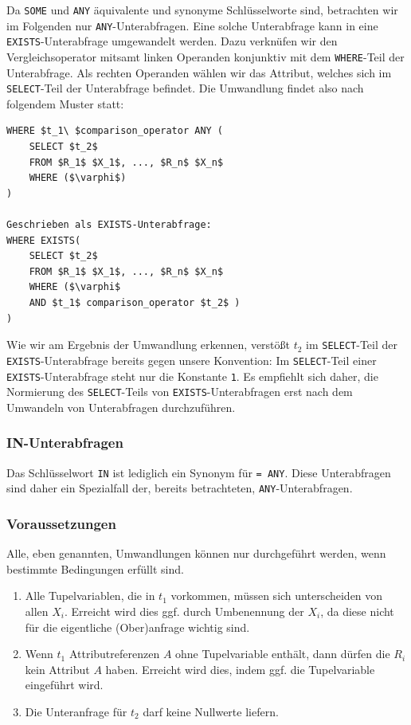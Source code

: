 Da \verb|SOME| und \verb|ANY| äquivalente und synonyme Schlüsselworte sind, betrachten wir im Folgenden nur \verb|ANY|-Unterabfragen. Eine solche Unterabfrage kann in eine \verb|EXISTS|-Unterabfrage umgewandelt werden. Dazu verknüfen wir den Vergleichsoperator mitsamt linken Operanden konjunktiv mit dem \verb|WHERE|-Teil der Unterabfrage. Als rechten Operanden wählen wir das Attribut, welches sich im \verb|SELECT|-Teil der Unterabfrage befindet. Die Umwandlung findet also nach folgendem Muster statt:

\begin{lstlisting}[mathescape]
WHERE $t_1\ $comparison_operator ANY (
	SELECT $t_2$
	FROM $R_1$ $X_1$, ..., $R_n$ $X_n$
	WHERE ($\varphi$) 
) 

Geschrieben als EXISTS-Unterabfrage:
WHERE EXISTS( 
	SELECT $t_2$
	FROM $R_1$ $X_1$, ..., $R_n$ $X_n$
	WHERE ($\varphi$ 
	AND $t_1$ comparison_operator $t_2$ )
)
\end{lstlisting}

Wie wir am Ergebnis der Umwandlung erkennen, verstößt $t_2$ im \verb|SELECT|-Teil der \verb|EXISTS|-Unterabfrage bereits gegen unsere Konvention: Im \verb|SELECT|-Teil einer \verb|EXISTS|-Unterabfrage steht nur die Konstante \verb|1|. Es empfiehlt sich daher, die Normierung des \verb|SELECT|-Teils von \verb|EXISTS|-Unterabfragen erst nach dem Umwandeln von Unterabfragen durchzuführen.


\subsubsection*{IN-Unterabfragen}

Das Schlüsselwort \verb|IN| ist lediglich ein Synonym für \verb|= ANY|. Diese Unterabfragen sind daher ein Spezialfall der, bereits betrachteten, \verb|ANY|-Unterabfragen.

\subsubsection*{Voraussetzungen}

Alle, eben genannten, Umwandlungen können nur durchgeführt werden, wenn bestimmte Bedingungen erfüllt sind.

\begin{enumerate}
\item Alle Tupelvariablen, die in $t_1$ vorkommen, müssen sich unterscheiden von allen $X_i$. Erreicht wird dies ggf. durch Umbenennung der $X_i$, da diese nicht für die eigentliche (Ober)anfrage wichtig sind.
\item Wenn $t_1$ Attributreferenzen $A$ ohne Tupelvariable enthält, dann dürfen die $R_i$ kein Attribut $A$ haben. Erreicht wird dies, indem ggf. die Tupelvariable eingeführt wird.
\item Die Unteranfrage für $t_2$ darf keine Nullwerte liefern. 
\end{enumerate}

